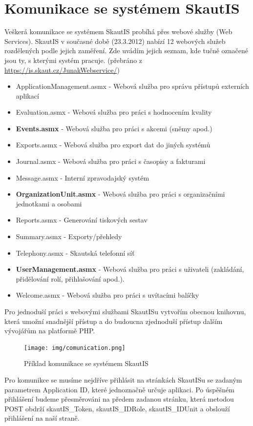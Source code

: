 \documentclass[thesis=B,czech]{FITthesis}[2011/06/14]
\begin{document}
\section{Komunikace se systémem SkautIS}
Veškerá komunikace se systémem SkautIS probíhá přes webové služby (Web Services). SkautIS v současné době (23.3.2012) nabízí 12 webových služeb rozdělených podle jejich zaměření. Zde uvádím jejich seznam, kde tučně označené jsou ty, s kterými systém pracuje. (přebráno z \url{https://is.skaut.cz/JunakWebservice/})
\begin{itemize}
	\item ApplicationManagement.asmx - Webová služba pro správu přístupů externích aplikací
	\item Evaluation.asmx - Webová služba pro práci s hodnocením kvality
	\item \textbf{Events.asmx} - Webová služba pro práci s akcemi (sněmy apod.)
	\item Exports.asmx - Webová služba pro export dat do jiných systémů
	\item Journal.asmx - Webová služba pro práci s časopisy a fakturami
	\item Message.asmx - Interní zpravodajský systém
	\item \textbf{OrganizationUnit.asmx} - Webová služba pro práci s organizačními jednotkami a osobami
	\item Reports.asmx - Generování tiskových sestav
	\item Summary.asmx - Exporty/přehledy
	\item Telephony.asmx - Skautská telefonní síť
	\item \textbf{UserManagement.asmx} - Webová služba pro práci s uživateli (zakládání, přidělování rolí, přihlašování apod.).
	\item Welcome.asmx - Webová služba pro práci s uvítacími balíčky
\end{itemize}

Pro jednoduší práci s webovými službami SkautISu vytvořím obecnou knihovnu, která umožní snadnější přístup a do budoucna zjednoduší přístup dalším vývojářům na platformě PHP.

\begin{figure}[h] \centering
 	\texttt{[image: img/comunication.png]}
 	\caption[SkautIS]{Příklad komunikace se systémem SkautIS}\label{fig:comunication-diagram}
\end{figure}

Pro komunikce se musíme nejdříve přihlásit na stránkách SkautISu se zadaným parametrem Application ID, které jednoznačně určuje aplikaci. Po úspěšném přihlášení budeme přesměrováni na předem zadanou stránku, která metodou POST obdrží skautIS\_Token, skautIS\_IDRole, skautIS\_IDUnit a obslouží přihlášení na naší straně.   
\end{document}
